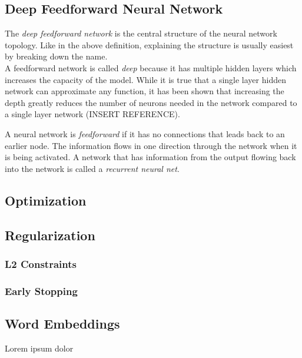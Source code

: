 
\subsection{Deep Feedforward Neural Network}

The \emph{deep feedforward network} is the central structure of the neural network topology. Like in the above definition, explaining the structure is usually easiest by breaking down the name.\\

A feedforward network is called \emph{deep} because it has multiple hidden layers which increases the capacity of the model. While it is true that a single layer hidden network can approximate any function, it has been shown that increasing the depth greatly reduces the number of neurons needed in the network compared to a single layer network (INSERT REFERENCE).

A neural network is \emph{feedforward} if it has no connections that leads back to an earlier node. The information flows in one direction through the network when it is being activated. A network that has information from the output flowing back into the network is called a \emph{recurrent neural net}. 


\subsection{Optimization}
\label{nn_optimization}

\subsection{Regularization}

\subsubsection{L2 Constraints}

\subsubsection{Early Stopping}

\subsection{Word Embeddings}
\label{sec:word_embeddings}

Lorem ipsum dolor

